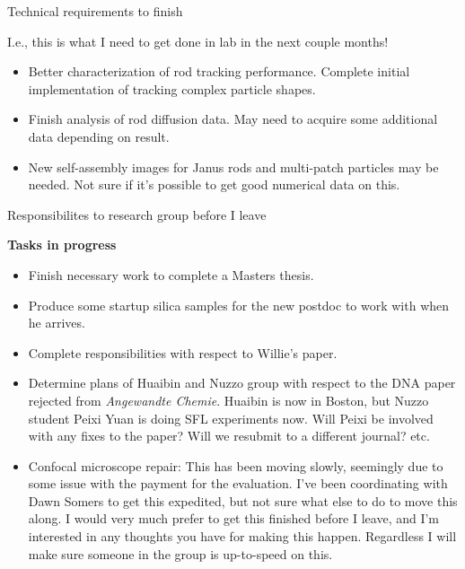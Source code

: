 \documentclass[11pt]{article}
\newcommand{\bigsection}[1]{	
	\vspace{4pt}
	{\fontfamily{phv}\selectfont\Large#1}

}
\begin{document}
\bigsection{Technical requirements to finish}

I.e., this is what I need to get done in lab in the next couple months!
\begin{itemize}
\item Better characterization of rod tracking performance. Complete initial implementation of tracking complex particle shapes.
\item Finish analysis of rod diffusion data.  May need to acquire some additional data depending on result.
\item New self-assembly images for Janus rods and multi-patch particles may be needed. Not sure if it's possible to get good numerical data on this.
\end{itemize}


\pagebreak

\bigsection{Responsibilites to research group before I leave}

\textbf{Tasks in progress}
\begin{itemize}

\item Finish necessary work to complete a Masters thesis.

\item Produce some startup silica samples for the new postdoc to work with when he arrives.

\item Complete responsibilities with respect to Willie's paper.

\item Determine plans of Huaibin and Nuzzo group with respect to the DNA paper rejected from \textit{Angewandte Chemie}.  Huaibin is now in Boston, but Nuzzo student
Peixi Yuan is doing SFL experiments now.  Will Peixi be involved with any fixes to the paper?  Will we resubmit to a different journal? etc.

\item Confocal microscope repair: This has been moving slowly, seemingly due to some issue with the payment for the evaluation.  I've been coordinating with Dawn Somers to get this expedited, but not sure what else to do to move this along.
I would very much prefer to get this finished before I leave, and I'm interested in any thoughts you have for making this happen.  Regardless I will make sure someone in the group is up-to-speed on this.

\end{itemize}
\end{document}
